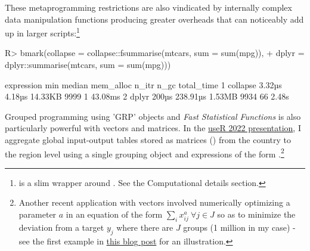 \documentclass[nojss]{jss} %
\newcommand{\fct}[1]{\code{#1()}}
\begin{document}
These metaprogramming restrictions are also vindicated by internally complex data manipulation functions producing greater overheads that can noticeably add up in larger scripts:\footnote{\fct{bmark} is a slim wrapper around \fct{bench::mark}. See the Computational details section.}
\begin{Schunk}
\begin{Sinput}
R>  bmark(collapse = collapse::fsummarise(mtcars, sum = sum(mpg)),
+         dplyr = dplyr::summarise(mtcars, sum = sum(mpg)))
\end{Sinput}
\begin{Soutput}
  expression      min   median mem_alloc n_itr n_gc total_time
1   collapse   3.32µs   4.18µs   14.33KB  9999    1    43.08ms
2      dplyr    200µs 238.91µs    1.53MB  9934   66      2.48s
\end{Soutput}
\end{Schunk}
Grouped programming using 'GRP' objects and \emph{Fast Statistical Functions} is also particularly powerful with vectors and matrices. In the \href{https://raw.githubusercontent.com/SebKrantz/collapse/master/misc/useR2022\%20presentation/collapse_useR2022_final.pdf}{useR 2022 presentation}, I aggregate global input-output tables stored as matrices () from the country to the region level using a single grouping object and expressions of the form .\footnote{Another recent application with vectors involved numerically optimizing a parameter $a$ in an equation of the form $\sum_i x_{ij}^a\ \forall j\in J$ so as to minimize the deviation from a target $y_j$ where there are $J$ groups (1 million in my case) - see the first example in \href{https://sebkrantz.github.io/Rblog/2023/04/12/collapse-and-the-fastverse-reflecting-the-past-present-and-future/}{this blog post} for an illustration.}
%
%
\end{document}
